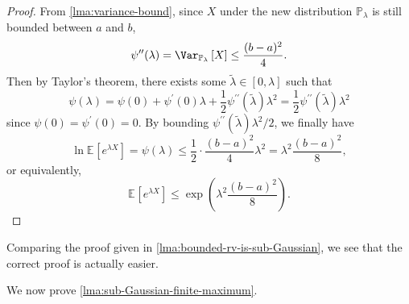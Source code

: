 \begin{proof}
	From \autoref{lma:variance-bound}, since \(X\) under the new distribution \(\mathbb{P} _\lambda \) is still bounded between \(a\) and \(b\),
	\[
		\psi ^{\prime\prime} (\lambda ) = \Var_{\mathbb{P} _\lambda }\left[X \right] \leq \frac{(b-a)^2}{4}.
	\]
	Then by Taylor's theorem, there exists some \(\widetilde{\lambda} \in [0, \lambda ]\) such that
	\[
		\psi (\lambda )
		= \psi (0) + \psi ^{\prime} (0) \lambda + \frac{1}{2} \psi ^{\prime\prime} (\widetilde{\lambda} )\lambda ^{2}
		= \frac{1}{2} \psi ^{\prime\prime} (\widetilde{\lambda} )\lambda ^{2}
	\]
	since \(\psi (0) = \psi ^{\prime} (0) = 0\). By bounding \(\psi ^{\prime\prime} (\widetilde{\lambda} )\lambda ^{2} / 2\), we finally have
	\[
		\ln \mathbb{E}_{}\left[e^{\lambda X} \right] = \psi (\lambda ) \leq \frac{1}{2}\cdot \frac{(b-a)^{2} }{4}\lambda ^{2} = \lambda ^{2} \frac{(b-a)^2}{8},
	\]
	or equivalently,
	\[
		\mathbb{E}_{}\left[e^{\lambda X} \right] \leq \exp \left( \lambda ^2 \frac{(b-a)^2}{8} \right) .
	\]
\end{proof}

\begin{remark}
	Comparing the proof given in \autoref{lma:bounded-rv-is-sub-Gaussian}, we see that the correct proof is actually easier.
\end{remark}

We now prove \autoref{lma:sub-Gaussian-finite-maximum}.

